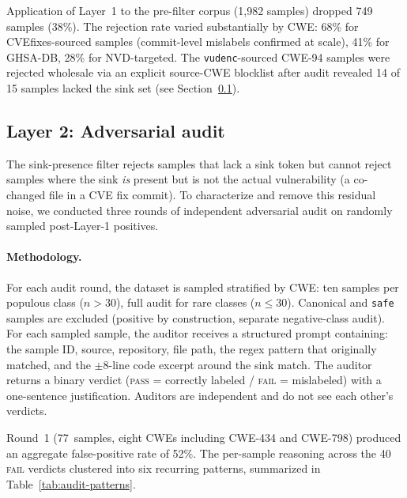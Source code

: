 Application of Layer~1 to the pre-filter corpus (1{,}982 samples)
dropped 749 samples (38\%). The rejection rate varied substantially
by CWE: 68\% for CVEfixes-sourced samples (commit-level mislabels
confirmed at scale), 41\% for GHSA-DB, 28\% for NVD-targeted. The
\texttt{vudenc}-sourced CWE-94 samples were rejected wholesale via
an explicit source-CWE blocklist after audit revealed 14 of 15
samples lacked the sink set (see Section~\ref{sec:dataset:audit}).

\subsection{Layer 2: Adversarial audit}
\label{sec:dataset:audit}

The sink-presence filter rejects samples that lack a sink token but
cannot reject samples where the sink \emph{is} present but is not
the actual vulnerability (a co-changed file in a CVE fix commit).
To characterize and remove this residual noise, we conducted three
rounds of independent adversarial audit on randomly sampled
post-Layer-1 positives.

\paragraph{Methodology.}
For each audit round, the dataset is sampled stratified by CWE: ten
samples per populous class ($n > 30$), full audit for rare classes
($n \le 30$). Canonical and \texttt{safe} samples are excluded
(positive by construction, separate negative-class audit). For each
sampled sample, the auditor receives a structured prompt containing:
the sample ID, source, repository, file path, the regex pattern
that originally matched, and the $\pm 8$-line code excerpt around
the sink match. The auditor returns a binary verdict
(\textsc{pass} = correctly labeled / \textsc{fail} = mislabeled)
with a one-sentence justification. Auditors are independent and do
not see each other's verdicts.

Round~1 (77~samples, eight CWEs including CWE-434 and CWE-798)
produced an aggregate false-positive rate of 52\%. The
per-sample reasoning across the 40 \textsc{fail} verdicts
clustered into six recurring patterns, summarized in
Table~\ref{tab:audit-patterns}.

